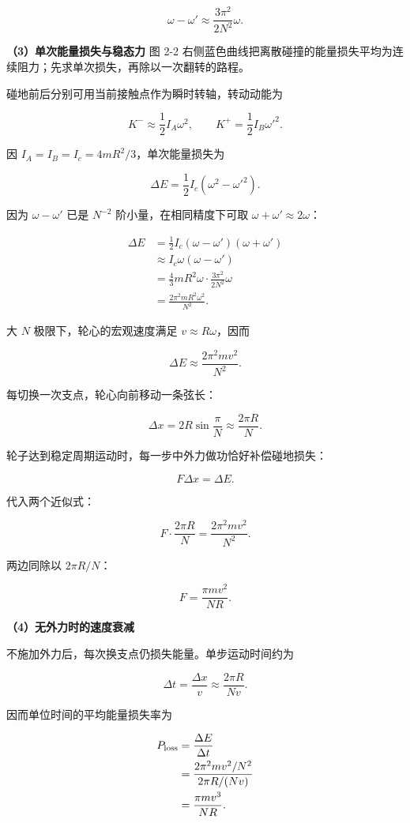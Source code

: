 \documentclass[12pt,a4paper,UTF8]{ctexart}
\begin{document}
\[\omega-\omega'\approx\frac{3\pi^2}{2N^2}\omega.\]

\textbf{（3）单次能量损失与稳态力} 图 2-2
右侧蓝色曲线把离散碰撞的能量损失平均为连续阻力；先求单次损失，再除以一次翻转的路程。

碰地前后分别可用当前接触点作为瞬时转轴，转动动能为

\[K^-\approx\frac12I_A\omega^2,\qquad
K^+=\frac12I_B\omega'^2.\]

因 \(I_A=I_B=I_c=4mR^2/3\)，单次能量损失为

\[\Delta E=\frac12I_c(\omega^2-\omega'^2).\]

因为 \(\omega-\omega'\) 已是 \(N^{-2}\) 阶小量，在相同精度下可取
\(\omega+\omega'\approx2\omega\)：

\[\begin{aligned}
\Delta E
&=\frac12I_c(\omega-\omega')(\omega+\omega')\\
&\approx I_c\omega(\omega-\omega')\\
&=\frac43mR^2\omega\cdot\frac{3\pi^2}{2N^2}\omega\\
&=\frac{2\pi^2mR^2\omega^2}{N^2}.
\end{aligned}\]

大 \(N\) 极限下，轮心的宏观速度满足 \(v\approx R\omega\)，因而

\[\Delta E\approx\frac{2\pi^2mv^2}{N^2}.\]

每切换一次支点，轮心向前移动一条弦长：

\[\Delta x=2R\sin\frac\pi N\approx\frac{2\pi R}{N}.\]

轮子达到稳定周期运动时，每一步中外力做功恰好补偿碰地损失：

\[F\Delta x=\Delta E.\]

代入两个近似式：

\[F\cdot\frac{2\pi R}{N}
=\frac{2\pi^2mv^2}{N^2}.\]

两边同除以 \(2\pi R/N\)：

\[\boxed{F=\frac{\pi mv^2}{NR}}.\]

\textbf{（4）无外力时的速度衰减}

不施加外力后，每次换支点仍损失能量。单步运动时间约为

\[\Delta t=\frac{\Delta x}{v}
\approx\frac{2\pi R}{Nv}.\]

因而单位时间的平均能量损失率为

\[\begin{aligned}
P_{\rm loss}
&=\frac{\Delta E}{\Delta t}\\
&=\frac{2\pi^2mv^2/N^2}{2\pi R/(Nv)}\\
&=\frac{\pi mv^3}{NR}.
\end{aligned}\]
\end{document}
